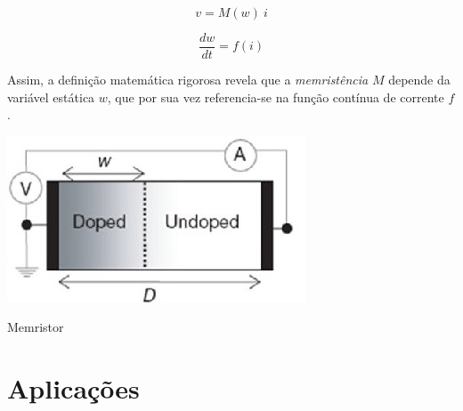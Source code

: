 \documentclass{ceel}
\begin{document}
\begin{multicols}{2}
\begin{equation}\label{eq01}
v=M( w) \ i
\end{equation}

\begin{equation}\label{eq02}
\dfrac{dw}{dt} =f(i) 
\end{equation}

Assim, a definição matemática rigorosa revela que a \emph{memristência} $M$ depende da variável estática $w$, que por sua vez referencia-se na função contínua de corrente $f$.


\begin{minipage}[h]{\columnwidth}
\centering
\captionsetup{type=figure}
\includegraphics[width=0.8\columnwidth]{memristor004}
\caption{Memristor}\label{memristor}
\end{minipage}

\section{Aplicações}\label{aplicacoes}

\end{multicols}
\end{document}
